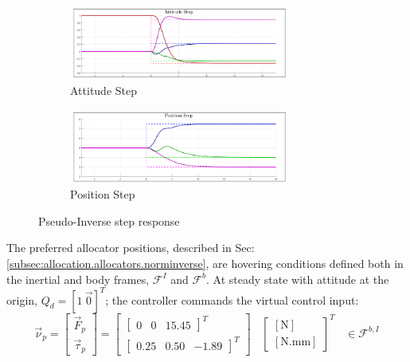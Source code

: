 \begin{figure}[hbtp]
\centering
\begin{subfigure}{\textwidth}
\centering
\includegraphics[width=0.8\textwidth]{graphs/pseudo_inverse_attitude}
\caption{Attitude Step}
\label{fig:pseudo_inverse_attitude}
\end{subfigure}
\begin{subfigure}{\textwidth}
\centering
\includegraphics[width=0.8\textwidth]{graphs/pseudo_inverse_position}
\caption{Position Step}
\label{fig:pseudo_inverse_position}
\end{subfigure}
\caption{Pseudo-Inverse step response}
\label{fig:pseudo-inverse-step}
\end{figure}
\par
The preferred allocator positions, described in Sec:\ref{subsec:allocation.allocators.norminverse}, are hovering conditions defined both in the inertial and body frames, $\mathcal{F}^{I}$ and $\mathcal{F}^{b}$. At steady state with attitude at the origin, $Q_d=[1~\vec{0}]^T$; the controller commands the virtual control input:
\begin{equation}\label{eq:hover-actuator}
\vec{\nu}_p=\begin{bmatrix}
\vec{F}_p\\
\vec{\tau}_p
\end{bmatrix}
=
\begin{bmatrix}
\begin{bmatrix}
0&0&15.45
\end{bmatrix}^T
\\
\begin{bmatrix}
0.25&
0.50&
-1.89
\end{bmatrix}^T
\end{bmatrix}~~~~\begin{bmatrix}
[\text{N}]\\
[\text{N.mm}]
\end{bmatrix}^T~~~~\in\mathcal{F}^{b,I}
\end{equation}
